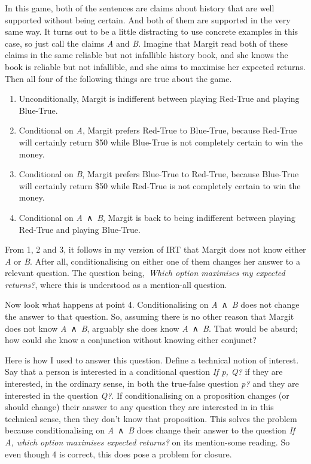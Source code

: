 \documentclass[
  10pt,
  letterpaper,
  twoside]{scrbook}
\providecommand{\tightlist}{%
  \setlength{\itemsep}{0pt}\setlength{\parskip}{0pt}}\usepackage{longtable,booktabs,array}
\begin{document}
In this game, both of the sentences are claims about history that are
well supported without being certain. And both of them are supported in
the very same way. It turns out to be a little distracting to use
concrete examples in this case, so just call the claims \emph{A} and
\emph{B}. Imagine that Margit read both of these claims in the same
reliable but not infallible history book, and she knows the book is
reliable but not infallible, and she aims to maximise her expected
returns. Then all four of the following things are true about the game.

\begin{enumerate}
\def\labelenumi{\arabic{enumi}.}
\tightlist
\item
  Unconditionally, Margit is indifferent between playing Red-True and
  playing Blue-True.
\item
  Conditional on \emph{A}, Margit prefers Red-True to Blue-True, because
  Red-True will certainly return \$50 while Blue-True is not completely
  certain to win the money.
\item
  Conditional on \emph{B}, Margit prefers Blue-True to Red-True, because
  Blue-True will certainly return \$50 while Red-True is not completely
  certain to win the money.
\item
  Conditional on \emph{A}~∧~\emph{B}, Margit is back to being
  indifferent between playing Red-True and playing Blue-True.
\end{enumerate}

From 1, 2 and 3, it follows in my version of IRT that Margit does not
know either \emph{A} or \emph{B}. After all, conditionalising on either
one of them changes her answer to a relevant question. The question
being,~\emph{Which option maximises my expected returns?}, where this is
understood as a mention-all question.

Now look what happens at point 4. Conditionalising on
\emph{A}~∧~\emph{B} does not change the answer to that question. So,
assuming there is no other reason that Margit does not know
\emph{A}~∧~\emph{B}, arguably she does know \emph{A}~∧~\emph{B}. That
would be absurd; how could she know a conjunction without knowing either
conjunct?

Here is how I used to answer this question. Define a technical notion of
interest. Say that a person is interested in a conditional question
\emph{If p, Q?} if they are interested, in the ordinary sense, in both
the true-false question \emph{p?} and they are interested in the
question \emph{Q?}. If conditionalising on a proposition changes (or
should change) their answer to any question they are interested in in
this technical sense, then they don't know that proposition. This solves
the problem because conditionalising on \emph{A}~∧~\emph{B} does change
their answer to the question \emph{If A, which option maximises expected
returns?} on its mention-some reading. So even though 4 is correct, this
does pose a problem for closure.
\end{document}
